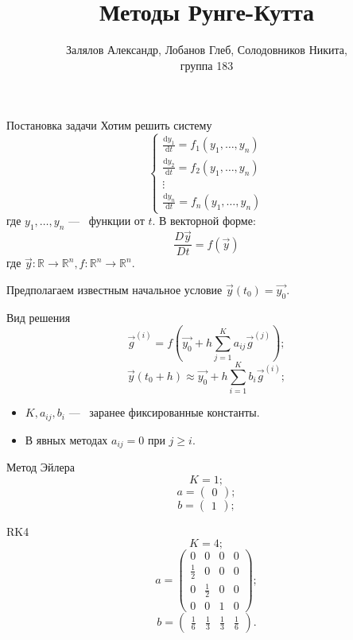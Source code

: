 \documentclass{beamer}
\title{Методы Рунге-Кутта}
\author{Залялов Александр, Лобанов Глеб, Солодовников Никита, \\ группа 183}
\date{}
\newcommand{\diff}{\mathrm{d}}
\begin{document}
\begin{frame}
	\titlepage
\end{frame}

\begin{frame}{Постановка задачи}
	Хотим решить систему
	\[ \begin{cases}
		\frac{\diff y_1}{\diff t} = f_1(y_1, \ldots, y_n) \\
		\frac{\diff y_2}{\diff t} = f_2(y_1, \ldots, y_n) \\
		\vdots \\
		\frac{\diff y_n}{\diff t} = f_n(y_1, \ldots, y_n)
	\end{cases} \]
	где $y_1, \ldots, y_n$ ---~ функции от $t$. В векторной форме:
	\[\frac{D\vec{y}}{D t} = f(\vec{y}) \]
	где $\vec{y}:\mathbb{R} \to \mathbb{R}^n, f:\mathbb{R}^n \to \mathbb{R}^n$.

	Предполагаем известным начальное условие $\vec{y}(t_0) = \vec{y_0}$.
\end{frame}

\begin{frame}{Вид решения}
	\[\vec{g}^{(i)} = f\left(\vec{y_0} + h\sum_{j = 1}^K a_{ij}\vec{g}^{(j)}\right); \]
	\[\vec{y}(t_0 + h) \approx \vec{y_0} + h\sum_{i = 1}^K b_i \vec{g}^{(i)};  \]

	\begin{itemize}
		\item<1-> $K, a_{ij}, b_i$ ---~ заранее фиксированные константы.
		\item<2-> В явных методах $a_{ij} = 0$ при $j \ge i$.
	\end{itemize}
\end{frame}

\begin{frame}{Метод Эйлера}
\[ K = 1; \]
\[ a = \begin{pmatrix} 0 \end{pmatrix}; \]
\[ b = \begin{pmatrix} 1 \end{pmatrix}; \]
\end{frame}

\begin{frame}{RK4}
	\[ K = 4; \]
	\[ a = \begin{pmatrix}
		0 & 0 & 0 & 0 \\
		\frac{1}{2} & 0 & 0 & 0 \\
		0 & \frac{1}{2} & 0 & 0 \\
		0 & 0 & 1 & 0
		\end{pmatrix}; \]
	\[ b = \begin{pmatrix} \frac{1}{6} & \frac{1}{3} & \frac{1}{3} & \frac{1}{6} \end{pmatrix}. \]
\end{frame}
\end{document}
